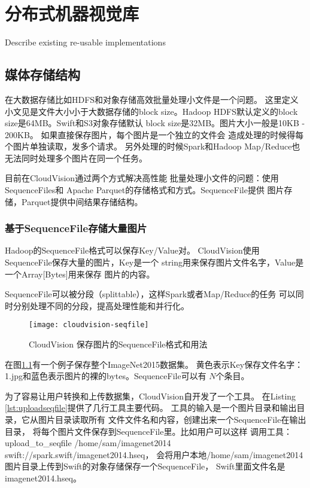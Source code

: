 \chapter{分布式机器视觉库}
\label{cha:distributed_vision_library}
Describe existing re-usable implementations

\section{媒体存储结构}
在大数据存储比如HDFS和对象存储高效批量处理小文件是一个问题。
这里定义小文见是文件大小小于大数据存储的block size。Hadoop
HDFS默认定义的block size是64MB。Swift和S3对象存储默认
block size是32MB。图片大小一般是10KB - 200KB。
如果直接保存图片，每个图片是一个独立的文件会
造成处理的时候得每个图片单独读取，发多个请求。
另外处理的时候Spark和Hadoop Map/Reduce也
无法同时处理多个图片在同一个任务。

目前在CloudVision通过两个方式解决高性能
批量处理小文件的问题：使用SequenceFiles和
Apache Parquet的存储格式和方式。SequenceFile提供
图片存储，Parquet提供中间结果存储结构。


\subsection{基于SequenceFile存储大量图片}
Hadoop的SequenceFile格式可以保存Key/Value对。
CloudVision使用SequenceFile保存大量的图片，Key是一个
string用来保存图片文件名字，Value是一个Array[Bytes]用来保存
图片的内容。

SequenceFile可以被分段（splittable），这样Spark或者Map/Reduce的任务
可以同时分别处理不同的分段，提高处理性能和并行化。

\begin{figure}[h]
  \centering
    \texttt{[image: cloudvision-seqfile]}
  \caption{CloudVision 保存图片的SequenceFile格式和用法}
  \label{fig:cloudvision-seqfile}
\end{figure}

在图\ref{fig:cloudvision-seqfile}有一个例子保存整个ImageNet2015数据集。
黄色表示Key保存文件名字：1.jpg和蓝色表示图片的裸的bytes。SequenceFile可以有
$N$个条目。

为了容易让用户转换和上传数据集，CloudVision自开发了一个工具。
在Listing \ref{lst:uploadseqfile}提供了几行工具主要代码。
工具的输入是一个图片目录和输出目录，它从图片目录读取所有
文件文件名和内容，创建出来一个SequenceFile在输出目录，
将每个图片文件保存到SequenceFile里。比如用户可以这样
调用工具：
upload\_to\_seqfile /home/sam/imagenet2014 swift://spark.swift/imagenet2014.hseq，
会将用户本地/home/sam/imagenet2014图片目录上传到Swift的对象存储保存一个SequenceFile，
Swift里面文件名是imagenet2014.hseq。

